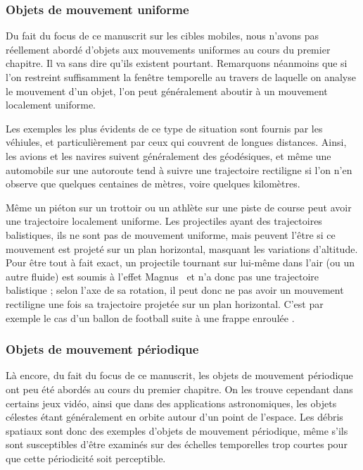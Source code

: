 	\subsubsection{Objets de mouvement uniforme}
	Du fait du focus de ce manuscrit sur les cibles mobiles, nous n'avons pas réellement abordé d'objets aux mouvements uniformes au cours du premier chapitre. Il va sans dire qu'ils existent pourtant. Remarquons néanmoins que si l'on restreint suffisamment la fenêtre temporelle au travers de laquelle on analyse le mouvement d'un objet, l'on peut généralement aboutir à un mouvement localement uniforme.
	
	Les exemples les plus évidents de ce type de situation sont fournis par les véhiules, et particulièrement par ceux qui couvrent de longues distances. Ainsi, les avions et les navires suivent généralement des géodésiques\footnotemark{}, et même une automobile sur une autoroute tend à suivre une trajectoire rectiligne si l'on n'en observe que quelques centaines de mètres, voire quelques kilomètres.
	
	
	Même un piéton sur un trottoir ou un athlète sur une piste de course peut avoir une trajectoire localement uniforme. Les projectiles ayant des trajectoires balistiques, ils ne sont pas de mouvement uniforme, mais peuvent l'être si ce mouvement est projeté sur un plan horizontal, masquant les variations d'altitude. Pour être tout à fait exact, un projectile tournant sur lui-même dans l'air (ou un autre fluide) est soumis à l'effet Magnus~\cite{magnus1853ueber, briggs1959effect} et n'a donc pas une trajectoire balistique ; selon l'axe de sa rotation, il peut donc ne pas avoir un mouvement rectiligne une fois sa trajectoire projetée sur un plan horizontal. C'est par exemple le cas d'un ballon de football suite à une \og frappe enroulée \fg{}.
	
	\subsubsection{Objets de mouvement périodique}
	Là encore, du fait du focus de ce manuscrit, les objets de mouvement périodique ont peu été abordés au cours du premier chapitre. On les trouve cependant dans certains jeux vidéo, ainsi que dans des applications astronomiques, les objets célestes étant généralement en orbite autour d'un point de l'espace. Les débris spatiaux sont donc des exemples d'objets de mouvement périodique, même s'ils sont susceptibles d'être examinés sur des échelles temporelles trop courtes pour que cette périodicité soit perceptible.
	
